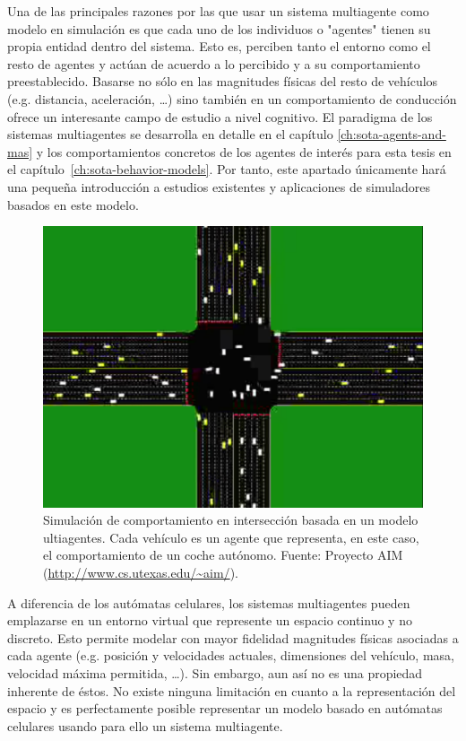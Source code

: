 Una de las principales razones por las que usar un sistema multiagente como modelo en simulación es que cada uno de los individuos o "agentes" tienen su propia entidad dentro del sistema. Esto es, perciben tanto el entorno como el resto de agentes y actúan de acuerdo a lo percibido y a su comportamiento preestablecido. Basarse no sólo en las magnitudes físicas del resto de vehículos (e.g. distancia, aceleración, \ldots) sino también en un comportamiento de conducción ofrece un interesante campo de estudio a nivel cognitivo. El paradigma de los sistemas multiagentes se desarrolla en detalle en el capítulo \ref{ch:sota-agents-and-mas} y los comportamientos concretos de los agentes de interés para esta tesis en el capítulo~\ref{ch:sota-behavior-models}. Por tanto, este apartado únicamente hará una pequeña introducción a estudios existentes y aplicaciones de simuladores basados en este modelo.

\begin{figure}
	\centering
	\includegraphics{images/autonomous-vehicles-at-intersections}
	\caption{Simulación de comportamiento en intersección basada en un modelo ultiagentes. Cada vehículo es un agente que representa, en este caso, el comportamiento de un coche autónomo. Fuente: Proyecto AIM (\url{http://www.cs.utexas.edu/~aim/}).}
	\label{fig:autonomous-vehicles-at-intersections}
\end{figure}

A diferencia de los autómatas celulares, los sistemas multiagentes pueden emplazarse en un entorno virtual que represente un espacio continuo y no discreto. Esto permite modelar con mayor fidelidad magnitudes físicas asociadas a cada agente (e.g. posición y velocidades actuales, dimensiones del vehículo, masa, velocidad máxima permitida, \ldots). Sin embargo, aun así no es una propiedad inherente de éstos. No existe ninguna limitación en cuanto a la representación del espacio y es perfectamente posible representar un modelo basado en autómatas celulares usando para ello un sistema multiagente.

